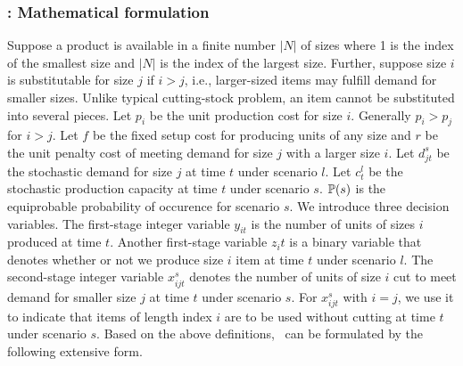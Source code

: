 \subsubsection{\sizes: Mathematical formulation}
Suppose a product is available in a finite number $|N|$ of sizes where 1 is the index of the smallest size and $|N|$ is the index of the largest size. Further, suppose size $i$ is substitutable for size $j$ if $i>j$, i.e., larger-sized items may fulfill demand for smaller sizes. Unlike typical cutting-stock problem, an item cannot be substituted into several pieces. 
Let $p_i$ be the unit production cost for size $i$. Generally $p_i>p_j$ for $i>j$. Let $f$ be the fixed setup cost for producing units of any size and $r$ be the unit penalty cost of meeting demand for size $j$ with a larger size $i$. Let $d_{jt}^s$ be the stochastic demand for size $j$ at time $t$ under scenario $l$. Let $c_t^l$ be the stochastic production capacity at time $t$ under scenario $s$. $\operatorname*{\mathbb{P}}(s)$ is the equiprobable probability of occurence for scenario $s$.
We introduce three decision variables. The first-stage integer variable $y_{it}$ is the number of units of sizes $i$ produced at time $t$. Another first-stage variable $z_it$ is a binary variable that denotes whether or not we produce size $i$ item at time $t$ under scenario $l$. The second-stage integer variable $x_{ijt}^s$ denotes the number of units of size $i$ cut to meet demand for smaller size $j$ at time $t$ under scenario $s$. For $x_{ijt}^s$ with $i=j$, we use it to indicate that items of length index $i$ are to be used without cutting at time $t$ under scenario $s$.
Based on the above definitions, \sizes\ can be formulated by the following extensive form.


